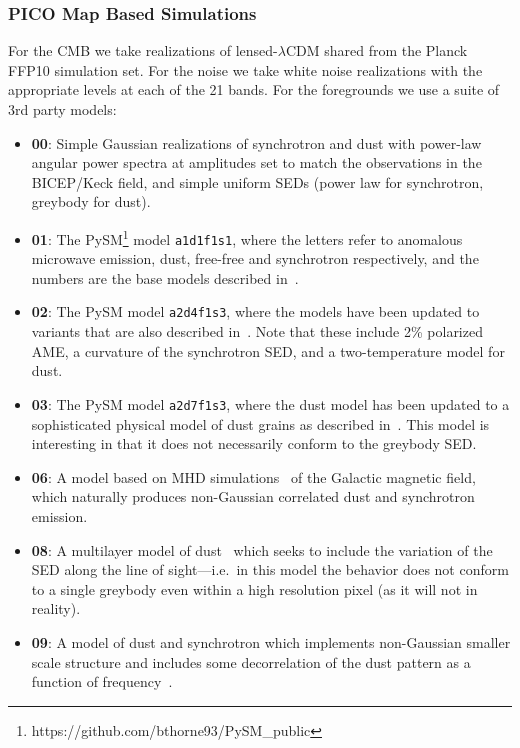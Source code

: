 \documentclass[PICOReport.tex]{subfiles}
\begin{document}
\subsubsection{PICO Map Based Simulations}

For the CMB we take realizations of lensed-$\lambda$CDM shared from the
Planck FFP10 simulation set.
For the noise we take white noise realizations with the appropriate
levels at each of the 21 bands.
For the foregrounds we use a suite of 3rd party models:

\begin{itemize}

\item {\bf 00}: Simple Gaussian realizations of synchrotron and dust with power-law angular power spectra at amplitudes set to match the observations in the BICEP/Keck field, and simple uniform SEDs (power law for synchrotron, greybody for dust).

\item {\bf 01}: The PySM\footnote{https://github.com/bthorne93/PySM\_public} model {\tt a1d1f1s1}, where the letters refer to anomalous microwave emission, dust, free-free and synchrotron respectively, and the numbers are the base models described in~\cite{Thorne:2016ifb}.

\item {\bf 02}: The PySM model {\tt a2d4f1s3}, where the models have been updated to variants that are also described in~\cite{Thorne:2016ifb}.  Note that these include 2\% polarized AME, a curvature of the synchrotron SED, and a two-temperature model for dust.

\item {\bf 03}: The PySM model {\tt a2d7f1s3}, where the dust model has been updated to a sophisticated physical model of dust grains as described in~\cite{Hensley:2015}.
This model is interesting in that it does not necessarily conform to the greybody SED.

\item {\bf 06}: A model based on MHD simulations~\citep{Kritsuk:2017} of the Galactic magnetic field, which naturally produces non-Gaussian correlated dust and synchrotron emission.

\item {\bf 08}: A multilayer model of dust~\citep{Martinez:2017}
which seeks to include the variation of
the SED along the line of sight---i.e.\ in this model the behavior does not
conform to a single greybody even within a high resolution pixel (as it will
not in reality).

\item {\bf 09}: A model of dust and synchrotron which implements non-Gaussian
smaller scale structure and includes some decorrelation of the dust
pattern as a function of frequency~\citep{Vansyngel:2016}.

\end{itemize}
\end{document}
